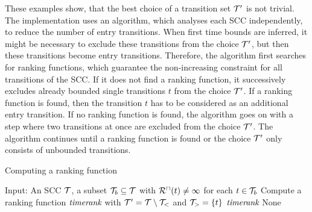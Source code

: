 These examples show, that the best choice of a transition set $\mathcal{T}'$ is not trivial.
The implementation uses an algorithm, which analyses each SCC independently, to reduce the number of entry transitions.
When first time bounds are inferred, it might be necessary to exclude these transitions from the choice $\mathcal{T}'$, but then these transitions become entry transitions.
Therefore, the algorithm first searches for ranking functions, which guarantee the non-increasing constraint for all transitions of the SCC.
If it does not find a ranking function, it successively excludes already bounded single transitions $t$ from the choice $\mathcal{T}'$.
If a ranking function is found, then the transition $t$ has to be considered as an additional entry transition.
If no ranking function is found, the algorithm goes on with a step where two transitions at once are excluded from the choice $\mathcal{T}'$.
The algorithm continues until a ranking function is found or the choice $\mathcal{T}'$ only consists of unbounded transitions.

\begin{algorithm}
\caption{Computing a ranking function}\label{ranking_function_algorithm}
\begin{algorithmic}[1]
  \State Input: An SCC $\mathcal{T}$, a subset $\mathcal{T}_b \subseteq \mathcal{T}$ with ${\mathcal{R}^\sqcap}(t) \neq \infty$ for each $t \in \mathcal{T}_b$
        \State Compute a ranking function $\emph{timerank}$ with $\mathcal{T}' = \mathcal{T} \setminus \mathcal{T}_<$ and $\mathcal{T}_> = \lbrace t \rbrace$
          \Return $\emph{timerank}$
        \EndIf
      \EndFor
    \EndFor
  \EndFor
  \Return None
\end{algorithmic}
\end{algorithm}
